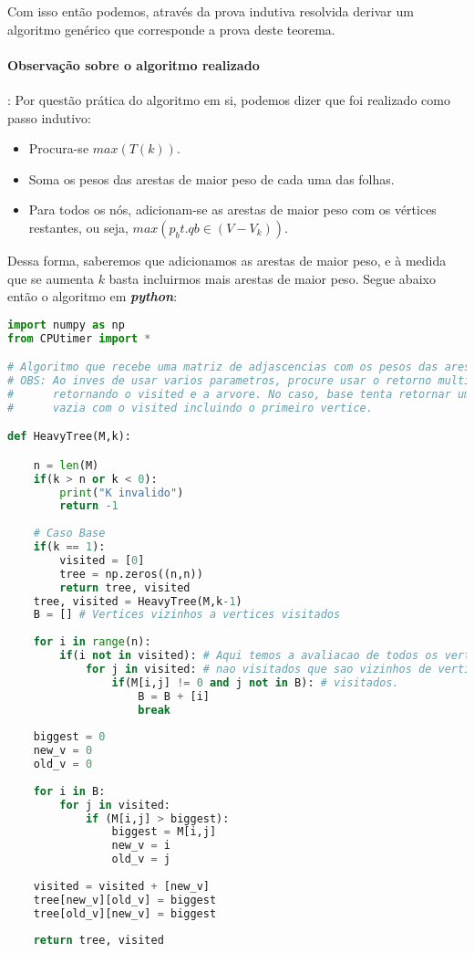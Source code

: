 \documentclass[paper=a4, fontsize=11pt]{scrartcl} %
\numberwithin{equation}{section} %
\numberwithin{figure}{section} %
\numberwithin{table}{section} %
\begin{document}
Com isso então podemos, através da prova indutiva resolvida derivar um algoritmo genérico que corresponde a prova deste teorema.

\paragraph{Observação sobre o algoritmo realizado}: Por questão prática do algoritmo em si, podemos dizer que foi realizado como passo indutivo:

\begin{itemize}
   \item Procura-se $max(T(k))$.
   \item Soma os pesos das arestas de maior peso de cada uma das folhas.
   \item Para todos os nós, adicionam-se as arestas de maior peso com os vértices restantes, ou seja, $max(p_b t.q b \in (V - V_k))$.
\end{itemize}

Dessa forma, saberemos que adicionamos as arestas de maior peso, e à medida que se aumenta $k$ basta incluirmos mais arestas de maior peso. Segue abaixo então o algoritmo em \emph{\textbf{python}}: \\

\begin{lstlisting}[language=Python, caption=Python algorithm]
import numpy as np
from CPUtimer import *

# Algoritmo que recebe uma matriz de adjascencias com os pesos das arestas.
# OBS: Ao inves de usar varios parametros, procure usar o retorno multiplo,
#      retornando o visited e a arvore. No caso, base tenta retornar uma matriz
#      vazia com o visited incluindo o primeiro vertice.

def HeavyTree(M,k):

    n = len(M) 
    if(k > n or k < 0):
        print("K invalido")
        return -1
    
    # Caso Base
    if(k == 1):
        visited = [0]
        tree = np.zeros((n,n))
        return tree, visited
    tree, visited = HeavyTree(M,k-1)
    B = [] # Vertices vizinhos a vertices visitados
    
    for i in range(n):
        if(i not in visited): # Aqui temos a avaliacao de todos os vertices
            for j in visited: # nao visitados que sao vizinhos de vertices 
                if(M[i,j] != 0 and j not in B): # visitados.
                    B = B + [i]
                    break
    
    biggest = 0
    new_v = 0
    old_v = 0
  
    for i in B:
        for j in visited:
            if (M[i,j] > biggest):
                biggest = M[i,j]
                new_v = i
                old_v = j
    
    visited = visited + [new_v]
    tree[new_v][old_v] = biggest
    tree[old_v][new_v] = biggest
    
    return tree, visited
\end{lstlisting}
\end{document}
